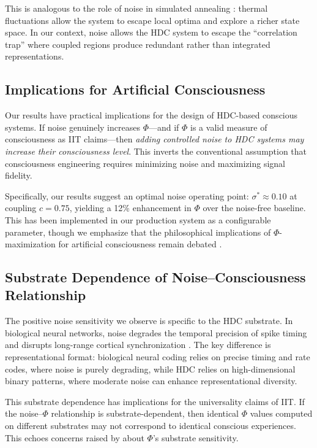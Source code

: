 \documentclass[12pt,a4paper]{article}
\begin{document}
This is analogous to the role of noise in simulated annealing \citep{kirkpatrick1983optimization}: thermal fluctuations allow the system to escape local optima and explore a richer state space. In our context, noise allows the HDC system to escape the ``correlation trap'' where coupled regions produce redundant rather than integrated representations.

\subsection{Implications for Artificial Consciousness}

Our results have practical implications for the design of HDC-based conscious systems. If noise genuinely increases $\Phi$---and if $\Phi$ is a valid measure of consciousness as IIT claims---then \emph{adding controlled noise to HDC systems may increase their consciousness level}. This inverts the conventional assumption that consciousness engineering requires minimizing noise and maximizing signal fidelity.

Specifically, our results suggest an optimal noise operating point: $\sigma^* \approx 0.10$ at coupling $c = 0.75$, yielding a 12\% enhancement in $\Phi$ over the noise-free baseline. This has been implemented in our production system as a configurable parameter, though we emphasize that the philosophical implications of $\Phi$-maximization for artificial consciousness remain debated \citep{aaronson2014phi, schwitzgebel2015if}.

\subsection{Substrate Dependence of Noise--Consciousness Relationship}

The positive noise sensitivity we observe is specific to the HDC substrate. In biological neural networks, noise degrades the temporal precision of spike timing \citep{mainen1995reliability} and disrupts long-range cortical synchronization \citep{mashour2014bottom}. The key difference is representational format: biological neural coding relies on precise timing and rate codes, where noise is purely degrading, while HDC relies on high-dimensional binary patterns, where moderate noise can enhance representational diversity.

This substrate dependence has implications for the universality claims of IIT. If the noise--$\Phi$ relationship is substrate-dependent, then identical $\Phi$ values computed on different substrates may not correspond to identical conscious experiences. This echoes concerns raised by \citet{aaronson2014phi} about $\Phi$'s substrate sensitivity.
\end{document}
